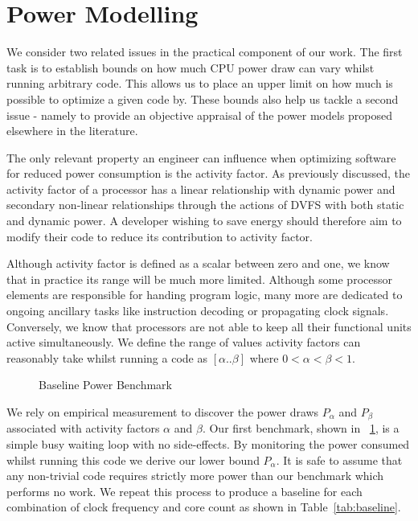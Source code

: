 \section{Power Modelling}
\label{sec:modelling}

We consider two related issues in the practical component of our work. The first task is to establish bounds on how much CPU power draw can vary whilst running arbitrary code. This allows us to place an upper limit on how much is possible to optimize a given code by. These bounds also help us tackle a second issue - namely to provide an objective appraisal of the power models proposed elsewhere in the literature.

The only relevant property an engineer can influence when optimizing software for reduced power consumption is the activity factor. As previously discussed, the activity factor of a processor has a linear relationship with dynamic power and secondary non-linear relationships through the actions of DVFS with both static and dynamic power. A developer wishing to save energy should therefore aim to modify their code to reduce its contribution to activity factor.

Although activity factor is defined as a scalar between zero and one, we know that in practice its range will be much more limited. Although some processor elements are responsible for handing program logic, many more are dedicated to ongoing ancillary tasks like instruction decoding or propagating clock signals. Conversely, we know that processors are not able to keep all their functional units active simultaneously.  We define the range of values activity factors can reasonably take whilst running a code as $[\alpha  .. \beta]$ where $0 < \alpha < \beta < 1$.

\begin{figure}[ht]                                                               
\centering                                                                      
\lstset{basicstyle=\ttfamily\footnotesize\bfseries,                             
      frame=tb}                                                                 
                             
\caption{Baseline Power Benchmark}                            
\label{fig:nopjmpres}                                                           
\end{figure}  

We rely on empirical measurement to discover the power draws $P_{\alpha}$ and $P_{\beta}$ associated with activity factors $\alpha$ and $\beta$. Our first benchmark, shown in \figurename~\ref{fig:nopjmpres}, is a simple busy waiting loop with no side-effects. By monitoring the power consumed whilst running this code we derive our lower bound ${P_{\alpha}}$. It is safe to assume that any non-trivial code requires strictly more power than our benchmark which performs no work. We repeat this process to produce a baseline for each combination of clock frequency and core count as shown in Table~\ref{tab:baseline}.

